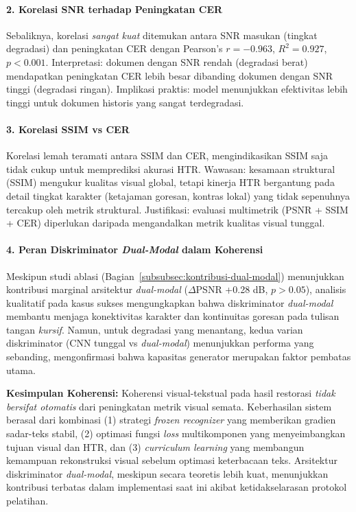 \documentclass[12pt,a4paper]{article}
\begin{document}
\paragraph{2. Korelasi SNR terhadap Peningkatan CER}
Sebaliknya, korelasi \textit{sangat kuat} ditemukan antara SNR masukan (tingkat degradasi) dan peningkatan CER dengan Pearson's $r = -0.963$, $R^2 = 0.927$, $p < 0.001$. Interpretasi: dokumen dengan SNR rendah (degradasi berat) mendapatkan peningkatan CER lebih besar dibanding dokumen dengan SNR tinggi (degradasi ringan). Implikasi praktis: model menunjukkan efektivitas lebih tinggi untuk dokumen historis yang sangat terdegradasi.

\paragraph{3. Korelasi SSIM vs CER}
Korelasi lemah teramati antara SSIM dan CER, mengindikasikan SSIM saja tidak cukup untuk memprediksi akurasi HTR. Wawasan: kesamaan struktural (SSIM) mengukur kualitas visual global, tetapi kinerja HTR bergantung pada detail tingkat karakter (ketajaman goresan, kontras lokal) yang tidak sepenuhnya tercakup oleh metrik struktural. Justifikasi: evaluasi multimetrik (PSNR + SSIM + CER) diperlukan daripada mengandalkan metrik kualitas visual tunggal.

\paragraph{4. Peran Diskriminator \textit{Dual-Modal} dalam Koherensi}
Meskipun studi ablasi (Bagian~\ref{subsubsec:kontribusi-dual-modal}) menunjukkan kontribusi marginal arsitektur \textit{dual-modal} ($\Delta$PSNR +0.28 dB, $p>0.05$), analisis kualitatif pada kasus sukses mengungkapkan bahwa diskriminator \textit{dual-modal} membantu menjaga konektivitas karakter dan kontinuitas goresan pada tulisan tangan \textit{kursif}. Namun, untuk degradasi yang menantang, kedua varian diskriminator (CNN tunggal vs \textit{dual-modal}) menunjukkan performa yang sebanding, mengonfirmasi bahwa kapasitas generator merupakan faktor pembatas utama.

\textbf{Kesimpulan Koherensi:} Koherensi visual-tekstual pada hasil restorasi \textit{tidak bersifat otomatis} dari peningkatan metrik visual semata. Keberhasilan sistem berasal dari kombinasi (1) strategi \textit{frozen recognizer} yang memberikan gradien sadar-teks stabil, (2) optimasi fungsi \textit{loss} multikomponen yang menyeimbangkan tujuan visual dan HTR, dan (3) \textit{curriculum learning} yang membangun kemampuan rekonstruksi visual sebelum optimasi keterbacaan teks. Arsitektur diskriminator \textit{dual-modal}, meskipun secara teoretis lebih kuat, menunjukkan kontribusi terbatas dalam implementasi saat ini akibat ketidakselarasan protokol pelatihan.
\end{document}
